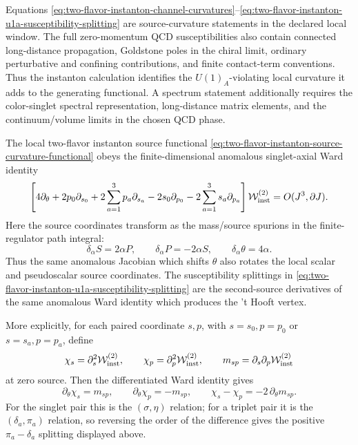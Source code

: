 \begin{controlledapproximation}
Equations
\eqref{eq:two-flavor-instanton-channel-curvatures}--\eqref{eq:two-flavor-instanton-u1a-susceptibility-splitting}
are source-curvature statements in the declared local window.  The full
zero-momentum QCD susceptibilities also contain connected long-distance
propagation, Goldstone poles in the chiral limit, ordinary perturbative and
confining contributions, and finite contact-term conventions.  Thus the
instanton calculation identifies the \(U(1)_A\)-violating local curvature it
adds to the generating functional.  A spectrum statement additionally requires
the color-singlet spectral representation, long-distance matrix elements, and
the continuum/volume limits in the chosen QCD phase.
\end{controlledapproximation}

\begin{proposition}
\label{prop:two-flavor-instanton-source-ward-ledger}
The local two-flavor instanton source functional
\eqref{eq:two-flavor-instanton-source-curvature-functional} obeys the
finite-dimensional anomalous singlet-axial Ward identity
\begin{equation}
  \left[
    4\partial_\theta
    +2p_0\partial_{s_0}
    +2\sum_{a=1}^{3}p_a\partial_{s_a}
    -2s_0\partial_{p_0}
    -2\sum_{a=1}^{3}s_a\partial_{p_a}
  \right]
  \mathcal W_{\rm inst}^{(2)}
  =
  O(J^3,\partial J).
  \label{eq:two-flavor-instanton-source-ward-identity}
\end{equation}
Here the source coordinates transform as the mass/source spurions in the
finite-regulator path integral:
\[
  \delta_\alpha S=2\alpha P,\qquad
  \delta_\alpha P=-2\alpha S,\qquad
  \delta_\alpha\theta=4\alpha .
\]
Thus the same anomalous Jacobian which shifts \(\theta\) also rotates the
local scalar and pseudoscalar source coordinates.  The susceptibility
splittings in
\eqref{eq:two-flavor-instanton-u1a-susceptibility-splitting} are the
second-source derivatives of the same anomalous Ward identity which produces
the 't Hooft vertex.

More explicitly, for each paired coordinate \(s,p\), with \(s=s_0,p=p_0\)
or \(s=s_a,p=p_a\), define
\[
  \chi_s=\partial_s^2\mathcal W_{\rm inst}^{(2)},\qquad
  \chi_p=\partial_p^2\mathcal W_{\rm inst}^{(2)},\qquad
  m_{sp}=\partial_s\partial_p\mathcal W_{\rm inst}^{(2)}
\]
at zero source.  Then the differentiated Ward identity gives
\begin{equation}
  \partial_\theta\chi_s=m_{sp},\qquad
  \partial_\theta\chi_p=-m_{sp},\qquad
  \chi_s-\chi_p=-2\,\partial_\theta m_{sp}.
  \label{eq:two-flavor-instanton-curvature-ward-relations}
\end{equation}
For the singlet pair this is the \((\sigma,\eta)\) relation; for a triplet
pair it is the \((\delta_a,\pi_a)\) relation, so reversing the order of the
difference gives the positive \(\pi_a-\delta_a\) splitting displayed above.
\end{proposition}

